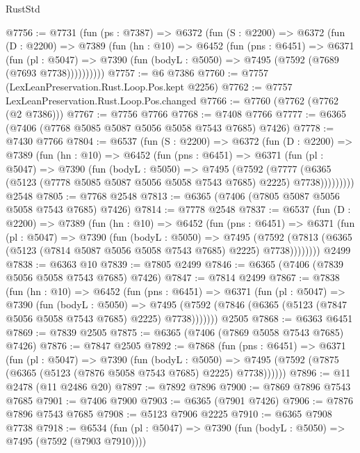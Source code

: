\begin{lexlean}{RustStd}
\begin{coremodule}
@7756 := @7731
    (fun (ps : @7387) =>
    @6372
      (fun (S : @2200) =>
      @6372
        (fun (D : @2200) =>
        @7389
          (fun (hn : @10) =>
          @6452
            (fun (pns : @6451) =>
            @6371
              (fun (pl : @5047) =>
              @7390 (fun (bodyL : @5050) => @7495 (@7592 (@7689 (@7693 @7738))))))))))
@7757 := @6 @7386
@7760 := @7757 (LexLeanPreservation.Rust.Loop.Pos.kept @2256)
@7762 := @7757 LexLeanPreservation.Rust.Loop.Pos.changed
@7766 := @7760 (@7762 (@7762 (@2 @7386)))
@7767 := @7756 @7766
@7768 := @7408 @7766
@7777 := @6365 (@7406 (@7768 @5085 @5087 @5056 @5058 @7543 @7685) @7426)
@7778 := @7430 @7766
@7804 := @6537
    (fun (S : @2200) =>
    @6372
      (fun (D : @2200) =>
      @7389
        (fun (hn : @10) =>
        @6452
          (fun (pns : @6451) =>
          @6371
            (fun (pl : @5047) =>
            @7390
              (fun (bodyL : @5050) =>
              @7495
                (@7592
                  (@7777
                    (@6365 (@5123 (@7778 @5085 @5087 @5056 @5058 @7543 @7685) @2225) @7738)))))))))
    @2548
@7805 := @7768 @2548
@7813 := @6365 (@7406 (@7805 @5087 @5056 @5058 @7543 @7685) @7426)
@7814 := @7778 @2548
@7837 := @6537
    (fun (D : @2200) =>
    @7389
      (fun (hn : @10) =>
      @6452
        (fun (pns : @6451) =>
        @6371
          (fun (pl : @5047) =>
          @7390
            (fun (bodyL : @5050) =>
            @7495
              (@7592 (@7813 (@6365 (@5123 (@7814 @5087 @5056 @5058 @7543 @7685) @2225) @7738))))))))
    @2499
@7838 := @6363 @10
@7839 := @7805 @2499
@7846 := @6365 (@7406 (@7839 @5056 @5058 @7543 @7685) @7426)
@7847 := @7814 @2499
@7867 := @7838
    (fun (hn : @10) =>
    @6452
      (fun (pns : @6451) =>
      @6371
        (fun (pl : @5047) =>
        @7390
          (fun (bodyL : @5050) =>
          @7495 (@7592 (@7846 (@6365 (@5123 (@7847 @5056 @5058 @7543 @7685) @2225) @7738)))))))
    @2505
@7868 := @6363 @6451
@7869 := @7839 @2505
@7875 := @6365 (@7406 (@7869 @5058 @7543 @7685) @7426)
@7876 := @7847 @2505
@7892 := @7868
    (fun (pns : @6451) =>
    @6371
      (fun (pl : @5047) =>
      @7390
        (fun (bodyL : @5050) =>
        @7495 (@7592 (@7875 (@6365 (@5123 (@7876 @5058 @7543 @7685) @2225) @7738))))))
@7896 := @11 @2478 (@11 @2486 @20)
@7897 := @7892 @7896
@7900 := @7869 @7896 @7543 @7685
@7901 := @7406 @7900
@7903 := @6365 (@7901 @7426)
@7906 := @7876 @7896 @7543 @7685
@7908 := @5123 @7906 @2225
@7910 := @6365 @7908 @7738
@7918 := @6534
    (fun (pl : @5047) => @7390 (fun (bodyL : @5050) => @7495 (@7592 (@7903 @7910))))

\end{coremodule}
\end{lexlean}

